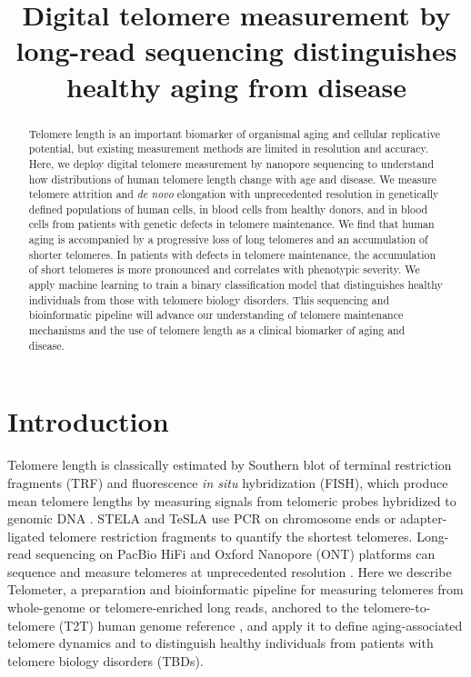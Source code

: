 \documentclass[11pt]{article}
\title{Digital telomere measurement by long-read sequencing distinguishes healthy aging from disease}
\author{}
\date{}
\begin{document}
\maketitle

\begin{abstract}
Telomere length is an important biomarker of organismal aging and cellular replicative potential, but existing measurement methods are limited in resolution and accuracy. Here, we deploy digital telomere measurement by nanopore sequencing to understand how distributions of human telomere length change with age and disease. We measure telomere attrition and \textit{de novo} elongation with unprecedented resolution in genetically defined populations of human cells, in blood cells from healthy donors, and in blood cells from patients with genetic defects in telomere maintenance. We find that human aging is accompanied by a progressive loss of long telomeres and an accumulation of shorter telomeres. In patients with defects in telomere maintenance, the accumulation of short telomeres is more pronounced and correlates with phenotypic severity. We apply machine learning to train a binary classification model that distinguishes healthy individuals from those with telomere biology disorders. This sequencing and bioinformatic pipeline will advance our understanding of telomere maintenance mechanisms and the use of telomere length as a clinical biomarker of aging and disease.
\end{abstract}

\section{Introduction}
Telomere length is classically estimated by Southern blot of terminal restriction fragments (TRF) and fluorescence \textit{in situ} hybridization (FISH), which produce mean telomere lengths by measuring signals from telomeric probes hybridized to genomic DNA \citep{r22,r23,r25}. STELA and TeSLA use PCR on chromosome ends or adapter-ligated telomere restriction fragments to quantify the shortest telomeres. Long-read sequencing on PacBio HiFi and Oxford Nanopore (ONT) platforms can sequence and measure telomeres at unprecedented resolution \citep{r26,r27}. Here we describe Telometer, a preparation and bioinformatic pipeline for measuring telomeres from whole-genome or telomere-enriched long reads, anchored to the telomere-to-telomere (T2T) human genome reference \citep{r28}, and apply it to define aging-associated telomere dynamics and to distinguish healthy individuals from patients with telomere biology disorders (TBDs).
\end{document}
